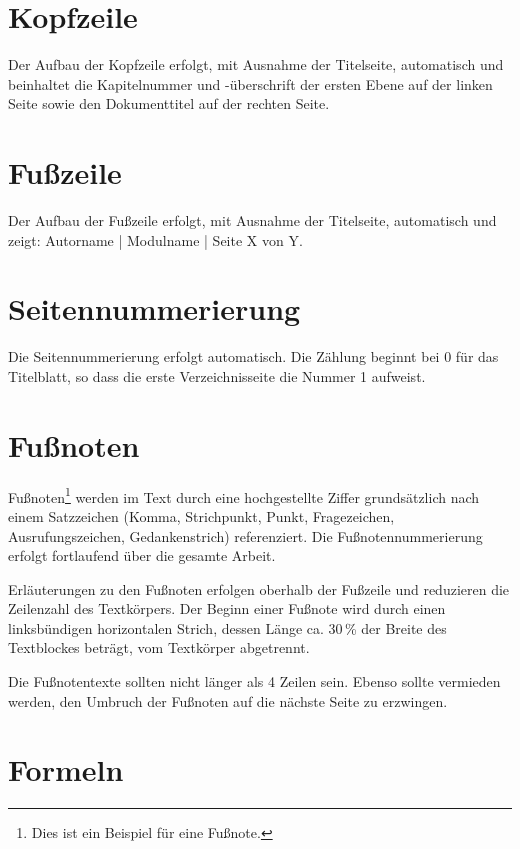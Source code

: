 \section{Kopfzeile}
\label{sec:kopfzeile}

Der Aufbau der Kopfzeile erfolgt, mit Ausnahme der Titelseite, automatisch und beinhaltet die Kapitelnummer und -überschrift der ersten Ebene auf der linken Seite sowie den Dokumenttitel auf der rechten Seite.

\section{Fußzeile}
\label{sec:fusszeile}

Der Aufbau der Fußzeile erfolgt, mit Ausnahme der Titelseite, automatisch und zeigt: Autorname | Modulname | Seite X von Y.

\section{Seitennummerierung}
\label{sec:seitennummerierung}

Die Seitennummerierung erfolgt automatisch. Die Zählung beginnt bei 0 für das Titelblatt, so dass die erste Verzeichnisseite die Nummer 1 aufweist.

\section{Fußnoten}
\label{sec:fussnoten}

Fußnoten\footnote{Dies ist ein Beispiel für eine Fußnote.} werden im Text durch eine hochgestellte Ziffer grundsätzlich nach einem Satzzeichen (Komma, Strichpunkt, Punkt, Fragezeichen, Ausrufungszeichen, Gedankenstrich) referenziert. Die Fußnotennummerierung erfolgt fortlaufend über die gesamte Arbeit.

Erläuterungen zu den Fußnoten erfolgen oberhalb der Fußzeile und reduzieren die Zeilenzahl des Textkörpers. Der Beginn einer Fußnote wird durch einen linksbündigen horizontalen Strich, dessen Länge ca. 30\,\% der Breite des Textblockes beträgt, vom Textkörper abgetrennt.

Die Fußnotentexte sollten nicht länger als 4 Zeilen sein. Ebenso sollte vermieden werden, den Umbruch der Fußnoten auf die nächste Seite zu erzwingen.

\section{Formeln}
\label{sec:formeln}

